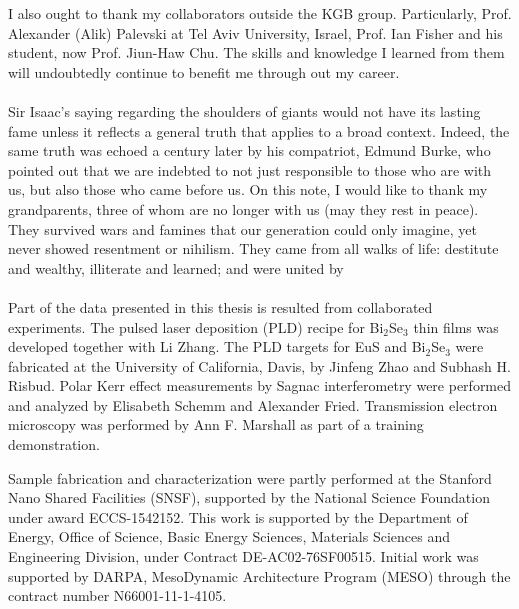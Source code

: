 I also ought to thank my collaborators outside the KGB group. Particularly, Prof. Alexander (Alik) Palevski at Tel Aviv University, Israel, Prof. Ian Fisher and his student, now Prof. Jiun-Haw Chu. The skills and knowledge I learned from them will undoubtedly continue to benefit me through out my career. 

\paragraph{}
Sir Isaac's saying regarding the shoulders of giants would not have its lasting fame unless it reflects a general truth that applies to a broad context. Indeed, the same truth was echoed a century later by his compatriot, Edmund Burke, who pointed out that we are indebted to not just responsible to those who are with us, but also those who came before us. On this note, I would like to thank my grandparents, three of whom are no longer with us (may they rest in peace). They survived wars and famines that our generation could only imagine, yet never showed resentment or nihilism. They came from all walks of life: destitute and wealthy, illiterate and learned; and were united by

\paragraph{}
Part of the data presented in this thesis is resulted from collaborated experiments. The pulsed laser deposition (PLD) recipe for Bi$_2$Se$_3$ thin films was developed together with Li Zhang. The PLD targets for EuS and Bi$_2$Se$_3$ were fabricated at the University of California, Davis, by Jinfeng Zhao and Subhash H. Risbud. Polar Kerr effect measurements by Sagnac interferometry were performed and analyzed by Elisabeth Schemm and Alexander Fried. Transmission electron microscopy was performed by Ann F. Marshall as part of a training demonstration.

Sample fabrication and characterization were partly performed at the Stanford Nano Shared Facilities (SNSF), supported by the National Science Foundation under award ECCS-1542152.  This work is supported by the Department of Energy,  Office of Science, Basic Energy Sciences, Materials Sciences and Engineering Division, under Contract DE-AC02-76SF00515. Initial work was supported by DARPA, MesoDynamic Architecture Program (MESO) through the contract number N66001-11-1-4105.